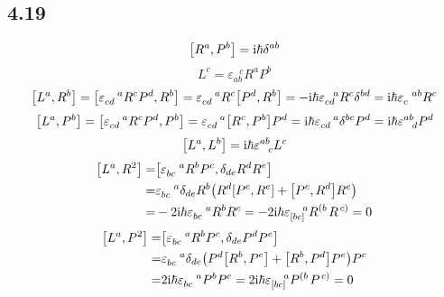 \subsection{4.19}
\begin{framed}
    \[
        \qty[R^{a}, P^{b}] = \mathrm{i} \hbar \delta^{ab}
    \] \[
        L^{c} = \varepsilon_{a b}^{\ \ \ c} R^{a} P^{b}
    \] \[
        \qty[L^{a}, R^{b}] = \qty[\varepsilon_{c d}^{\ \ \ a} R^{c} P^{d}, R^{b}] = \varepsilon_{c d}^{\ \ \ a} R^{c} \qty[P^{d}, R^{b}] = - \mathrm{i} \hbar \varepsilon_{c d}^{\ \ a} R^c \delta^{bd} = \mathrm{i} \hbar \varepsilon_{c}^{\ \ ab} R^c
    \] \[
        \qty[L^{a}, P^{b}] = \qty[\varepsilon_{c d}^{\ \ \ a} R^{c} P^{d}, P^{b}] = \varepsilon_{c d}^{\ \ \ a} \qty[R^{c}, P^{b}] P^{d} = \rmi \hbar \varepsilon_{c d}^{\ \ \ a} \delta^{b c} P^{d} = \rmi \hbar \varepsilon^{a b}_{\ \ d} P^{d}
    \] \[
        \qty[L^a, L^b] = \rmi \hbar \varepsilon^{a b}_{\ \ c} L^{c}
    \] \begin{align*}
        \qty[L^a, R^2] = & \qty[\varepsilon_{b c}^{\ \ \ a} R^b P^c, \delta_{d e} R^d R^e]                                                                                   \\
        =                & \varepsilon_{b c}^{\ \ \ a} \delta_{d e} R^{b} \qty(R^d \qty[P^c, R^e] + \qty[P^c, R^d] R^e)                                                      \\
        =                & -2 \mathrm{i} \hbar \varepsilon_{b c}^{\ \ \ a} R^b R^c = -2 \mathrm{i} \hbar \varepsilon_{\qty[b c]}^{\ \ \ a} R^{\left( b \right.} R^{\left. c \right)} = 0
    \end{align*} \begin{align*}
        \qty[L^a, P^2] = & \qty[\varepsilon_{b c}^{\ \ \ a} R^b P^c, \delta_{d e} P^d P^e]                                                                                   \\
        =                & \varepsilon_{b c}^{\ \ \ a} \delta_{d e} \qty(P^d \qty[R^b, P^e] + \qty[R^b, P^d] P^e) P^c                                                        \\
        =                & 2 \mathrm{i} \hbar \varepsilon_{bc}^{\ \ \ a} P^{b} P^{c} = 2 \mathrm{i} \hbar \varepsilon_{\qty[bc]}^{\ \ \ a} P^{\left( b \right.} P^{\left. c \right)} = 0
    \end{align*}
\end{framed}


